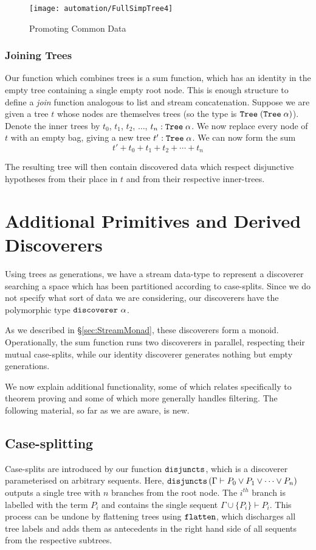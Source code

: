 \begin{figure}
\centering\texttt{[image: automation/FullSimpTree4]}
\caption{Promoting Common Data}
\label{fig:TreePromoting}
\end{figure}

\subsubsection{Joining Trees}
Our function which combines trees is a sum function, which has an identity in the empty tree containing a single empty root node. This is enough structure to define a \emph{join} function analogous to list and stream concatenation. Suppose we are given a tree $t$ whose nodes are themselves trees (so the type is $\texttt{Tree}\;(\texttt{Tree}\; \alpha)$). Denote the inner trees by $t_0$, $t_1$, $t_2$, $\ldots$, $t_n : \texttt{Tree}\;\alpha$. We now replace every node of $t$ with an empty bag, giving a new tree $t' : \texttt{Tree}\;\alpha$. We can now form the sum 
\begin{displaymath}
t' + t_0 + t_1 + t_2 + \cdots + t_n
\end{displaymath}

The resulting tree will then contain discovered data which respect disjunctive hypotheses from their place in $t$ and from their respective inner-trees.

\section{Additional Primitives and Derived Discoverers}\label{sec:Additional}
Using trees as generations, we have a stream data-type to represent a discoverer searching a space which has been partitioned according to case-splits. Since we do not specify what sort of data we are considering, our discoverers have the polymorphic type $\texttt{discoverer}\ \alpha$. 

As we described in \S\ref{sec:StreamMonad}, these discoverers form a monoid. Operationally, the sum function runs two discoverers in parallel, respecting their mutual case-splits, while our identity discoverer generates nothing but empty generations.

We now explain additional functionality, some of which relates specifically to theorem proving and some of which more generally handles filtering. The following material, so far as we are aware, is new.

\subsection{Case-splitting}
Case-splits are introduced by our function $\texttt{disjuncts}$, which is a discoverer parameterised on arbitrary sequents. Here, $\texttt{disjuncts}\left(\Gamma \vdash P_0 \vee P_1 \vee \cdots \vee P_n\right)$ outputs a single tree with $n$ branches from the root node. The $i^{th}$ branch is labelled with the term $P_i$ and contains the single sequent $\Gamma \cup \{P_i\} \vdash P_i$. This process can be undone by flattening trees using $\texttt{flatten}$, which discharges all tree labels and adds them as antecedents in the right hand side of all sequents from the respective subtrees.

